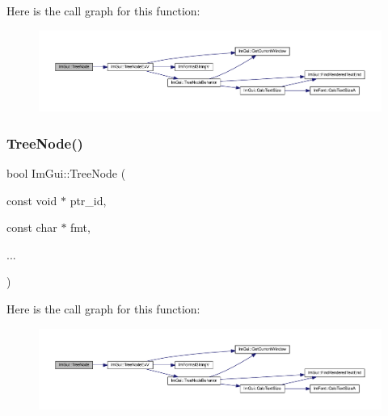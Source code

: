 Here is the call graph for this function\+:
\nopagebreak
\begin{figure}[H]
\begin{center}
\leavevmode
\includegraphics[width=350pt]{namespace_im_gui_a6e6e4de20291002430854cbd8cd58843_cgraph}
\end{center}
\end{figure}
\mbox{\label{namespace_im_gui_a47f1421323f90fdd0a9cbfea2338b10f}} 
\subsubsection{\texorpdfstring{Tree\+Node()}{TreeNode()}\hspace{0.1cm}{\footnotesize\ttfamily [3/3]}}
{\footnotesize\ttfamily bool Im\+Gui\+::\+Tree\+Node (\begin{DoxyParamCaption}\item[{const void $\ast$}]{ptr\+\_\+id,  }\item[{const char $\ast$}]{fmt,  }\item[{}]{... }\end{DoxyParamCaption})}

Here is the call graph for this function\+:
\nopagebreak
\begin{figure}[H]
\begin{center}
\leavevmode
\includegraphics[width=350pt]{namespace_im_gui_a47f1421323f90fdd0a9cbfea2338b10f_cgraph}
\end{center}
\end{figure}
\mbox{\label{namespace_im_gui_a918eabf70d288e93b2519ee1eac2c0b4}} 
